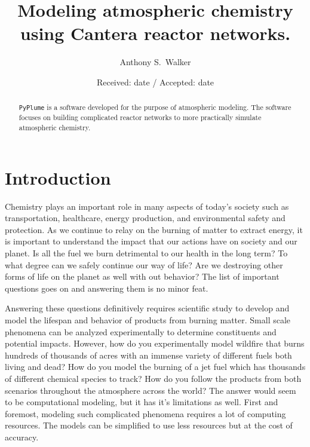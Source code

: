 \documentclass[smallextended,referee]{svjour3}
\begin{document}
\title{Modeling atmospheric chemistry using Cantera reactor networks.}


\author{Anthony S.~Walker}


\date{Received: date / Accepted: date}

\maketitle 

\begin{abstract}
\texttt{PyPlume} is a software developed for the purpose of atmospheric modeling. The software focuses on building complicated reactor networks to more practically simulate atmospheric chemistry. 
\end{abstract}


\section{Introduction}
Chemistry plays an important role in many aspects of today's society such as transportation, healthcare, energy production, and environmental safety and protection. As we continue to relay on the burning of matter to extract energy, it is important to understand the impact that our actions have on society and our planet. Is all the fuel we burn detrimental to our health in the long term? To what degree can we safely continue our way of life? Are we destroying other forms of life on the planet as well with out behavior? The list of important questions goes on and answering them is no minor feat.

Answering these questions definitively requires scientific study to develop and model the lifespan and behavior of products from burning matter. Small scale phenomena can be analyzed experimentally to determine constituents and potential impacts. However, how do you experimentally model wildfire that burns hundreds of thousands of acres with an immense variety of different fuels both living and dead? How do you model the burning of a jet fuel which has thousands of different chemical species to track? How do you follow the products from both scenarios throughout the atmosphere across the world? The answer would seem to be computational modeling, but it has it's limitations as well. First and foremost, modeling such complicated phenomena requires a lot of computing resources. The models can be simplified to use less resources but at the cost of accuracy.
\end{document}
